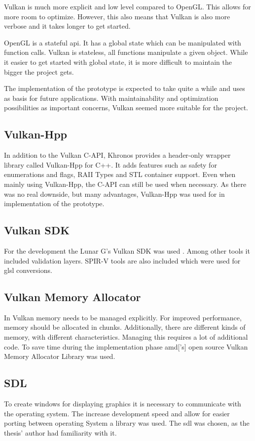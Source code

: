 Vulkan is much more explicit and low level compared to OpenGL. This allows for more room to optimize. However, this also means that Vulkan is also more verbose and it takes longer to get started.

OpenGL is a stateful \gls{api}. It has a global state which can be manipulated with function calls. Vulkan is stateless, all functions manipulate a given object. While it easier to get started with global state, it is more difficult to maintain the bigger the project gets.

The implementation of the prototype is expected to take quite a while and uses as basis for future applications. With maintainability and optimization possibilities as important concerns, Vulkan seemed more suitable for the project. 


\subsection{Vulkan-Hpp}
In addition to the Vulkan C-API, Khronos provides a header-only wrapper library called Vulkan-Hpp for C++. It adds features such as safety for enumerations and flags, RAII Types and STL container support. Even when mainly using Vulkan-Hpp, the C-API can still be used when necessary. As there was no real downside, but many advantages, Vulkan-Hpp was used for in implementation of the prototype.


\subsection{Vulkan SDK}
For the development the Lunar G's Vulkan SDK was used \cite{lunarg:vulkansdk}. Among other tools it included validation layers. SPIR-V tools are also included which were used for \gls{glsl} conversions.

\subsection{Vulkan Memory Allocator}
In Vulkan memory needs to be managed explicitly. For improved performance, memory should be allocated in chunks. Additionally, there are different kinds of memory, with different characteristics. Managing this requires a lot of additional code. To save time during the implementation phase \gls{amd}['s] open source Vulkan Memory Allocator Library \cite{amd:vulkanmemoryallocator} was used.


\subsection{SDL}
To create windows for displaying graphics it is necessary to communicate with the operating system. The increase development speed and allow for easier porting between operating System a library was used. The \gls{sdl} \cite{sdl} was chosen, as the thesis' author had familiarity with it.

